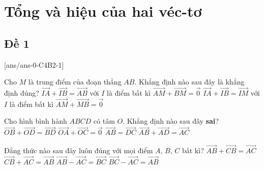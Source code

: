 \section{Tổng và hiệu của hai véc-tơ}

\subsection{Đề 1}
[ans/ans-0-C4B2-1]
\caulc
\begin{ex}%
	Cho $M$ là trung điểm của đoạn thẳng $AB$. Khẳng định nào sau đây là khẳng định đúng?
	\choice
	{$\overrightarrow{IA}+\overrightarrow{IB}=\overrightarrow{AB}$ với $I$ là điểm bất kì}
	{\True $\overrightarrow{AM}+\overrightarrow{BM}=\overrightarrow{0}$}
	{$\overrightarrow{IA}+\overrightarrow{IB}=\overrightarrow{IM}$ với $I$ là điểm bất kì}
	{$\overrightarrow{AM}+\overrightarrow{MB}=\overrightarrow{0}$}
\end{ex}

\begin{ex}%
	Cho hình bình hành $ABCD$ có tâm $O$. Khẳng định nào sau đây \textbf{sai}?
	\choice
	{\True $\overrightarrow{OB}+\overrightarrow{OD}=\overrightarrow{BD}$}
	{$\overrightarrow{OA}+\overrightarrow{OC}=\overrightarrow{0}$}
	{$\overrightarrow{AB}=\overrightarrow{DC}$}
	{$\overrightarrow{AB}+\overrightarrow{AD}=\overrightarrow{AC}$}
\end{ex}

\begin{ex}%
	Đẳng thức nào sau đây luôn đúng với mọi điểm $A$, $B$, $C$ bất kì?
	\choice
	{$\overrightarrow{AB}+\overrightarrow{CB}=\overrightarrow{AC}$}
	{\True $\overrightarrow{CB}+\overrightarrow{AC}=\overrightarrow{AB}$}
	{$\overrightarrow{AB}-\overrightarrow{AC}=\overrightarrow{BC}$}
	{$\overrightarrow{BC}-\overrightarrow{AC}=\overrightarrow{AB}$}
\end{ex}

